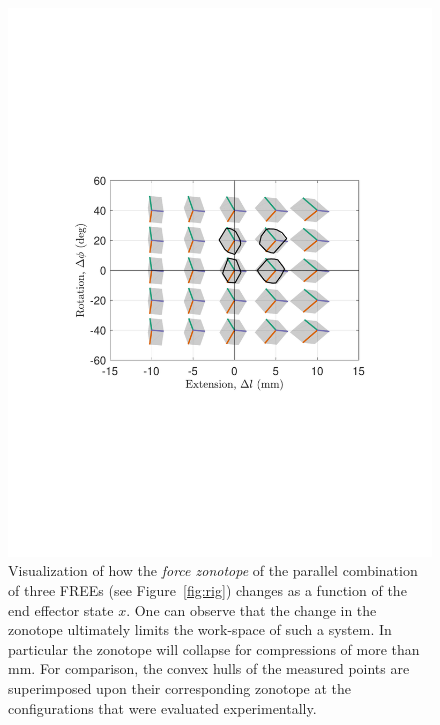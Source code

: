 \begin{figure}
    \centering
    \includegraphics[width=\linewidth]{figures/zntp_vs_x4.pdf}
    \caption{Visualization of how the \emph{force zonotope} of the parallel combination of three FREEs (see Figure~\ref{fig:rig}) changes as a function of the end effector state $x$. One can observe that the change in the zonotope ultimately limits the work-space of such a system.  In particular the zonotope will collapse for compressions of more than \unit[-10]{mm}.  For comparison, the convex hulls of the measured points are superimposed upon their corresponding zonotope at the configurations that were evaluated experimentally.}
    \label{fig:zntp_vs_x}
\end{figure}


















































